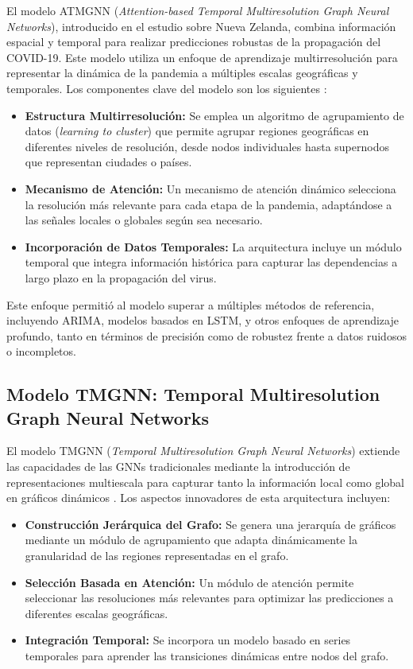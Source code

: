 El modelo ATMGNN (\textit{Attention-based Temporal Multiresolution Graph Neural Networks}), introducido en el estudio sobre Nueva Zelanda, combina información espacial y temporal para realizar predicciones robustas de la propagación del COVID-19. Este modelo utiliza un enfoque de aprendizaje multirresolución para representar la dinámica de la pandemia a múltiples escalas geográficas y temporales. Los componentes clave del modelo son los siguientes \cite{174}:

\begin{itemize}
    \item \textbf{Estructura Multirresolución:} Se emplea un algoritmo de agrupamiento de datos (\textit{learning to cluster}) que permite agrupar regiones geográficas en diferentes niveles de resolución, desde nodos individuales hasta supernodos que representan ciudades o países.
    \item \textbf{Mecanismo de Atención:} Un mecanismo de atención dinámico selecciona la resolución más relevante para cada etapa de la pandemia, adaptándose a las señales locales o globales según sea necesario.
    \item \textbf{Incorporación de Datos Temporales:} La arquitectura incluye un módulo temporal que integra información histórica para capturar las dependencias a largo plazo en la propagación del virus.
\end{itemize}

Este enfoque permitió al modelo superar a múltiples métodos de referencia, incluyendo ARIMA, modelos basados en LSTM, y otros enfoques de aprendizaje profundo, tanto en términos de precisión como de robustez frente a datos ruidosos o incompletos.

\subsection{Modelo TMGNN: Temporal Multiresolution Graph Neural Networks}

El modelo TMGNN (\textit{Temporal Multiresolution Graph Neural Networks}) extiende las capacidades de las GNNs tradicionales mediante la introducción de representaciones multiescala para capturar tanto la información local como global en gráficos dinámicos \cite{172}. Los aspectos innovadores de esta arquitectura incluyen:

\begin{itemize}
    \item \textbf{Construcción Jerárquica del Grafo:} Se genera una jerarquía de gráficos mediante un módulo de agrupamiento que adapta dinámicamente la granularidad de las regiones representadas en el grafo.
    \item \textbf{Selección Basada en Atención:} Un módulo de atención permite seleccionar las resoluciones más relevantes para optimizar las predicciones a diferentes escalas geográficas.
    \item \textbf{Integración Temporal:} Se incorpora un modelo basado en series temporales para aprender las transiciones dinámicas entre nodos del grafo.
\end{itemize}

